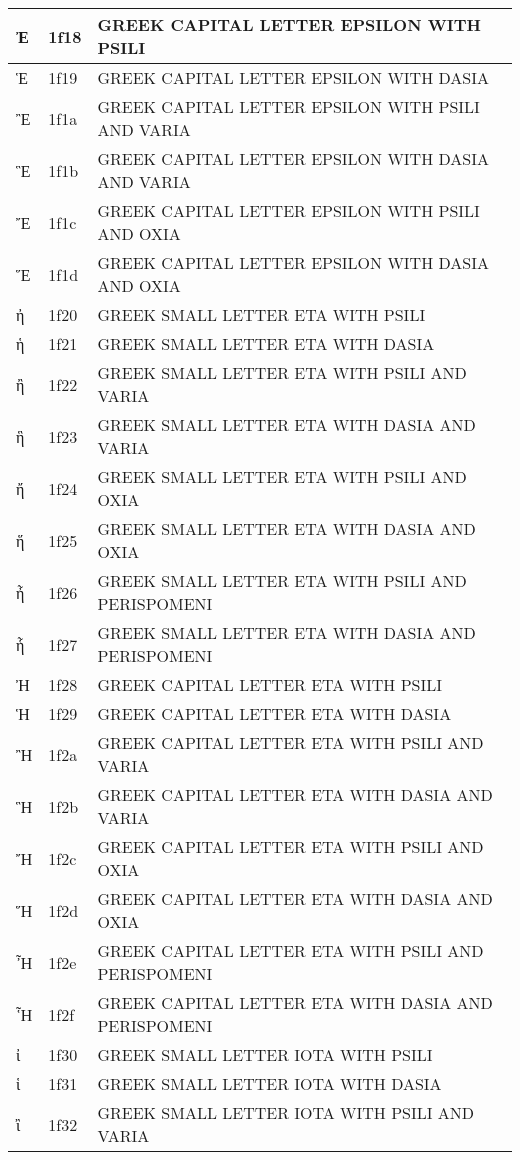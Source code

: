 \documentclass[12pt,letterpaper,openany]{book}
\begin{document}
\begin{center}
\begin{supertabular}{|m{0.25in}|m{0.5in}|m{4in}|}
			Ἐ & 1f18 & GREEK CAPITAL LETTER EPSILON WITH PSILI\\\hline
			Ἑ & 1f19 & GREEK CAPITAL LETTER EPSILON WITH DASIA\\\hline
			Ἒ & 1f1a & GREEK CAPITAL LETTER EPSILON WITH PSILI AND VARIA\\\hline
			Ἓ & 1f1b & GREEK CAPITAL LETTER EPSILON WITH DASIA AND VARIA\\\hline
			Ἔ & 1f1c & GREEK CAPITAL LETTER EPSILON WITH PSILI AND OXIA\\\hline
			Ἕ & 1f1d & GREEK CAPITAL LETTER EPSILON WITH DASIA AND OXIA\\\hline
			ἠ & 1f20 & GREEK SMALL LETTER ETA WITH PSILI\\\hline
			ἡ & 1f21 & GREEK SMALL LETTER ETA WITH DASIA\\\hline
			ἢ & 1f22 & GREEK SMALL LETTER ETA WITH PSILI AND VARIA\\\hline
			ἣ & 1f23 & GREEK SMALL LETTER ETA WITH DASIA AND VARIA\\\hline
			ἤ & 1f24 & GREEK SMALL LETTER ETA WITH PSILI AND OXIA\\\hline
			ἥ & 1f25 & GREEK SMALL LETTER ETA WITH DASIA AND OXIA\\\hline
			ἦ & 1f26 & GREEK SMALL LETTER ETA WITH PSILI AND PERISPOMENI\\\hline
			ἧ & 1f27 & GREEK SMALL LETTER ETA WITH DASIA AND PERISPOMENI\\\hline
			Ἠ & 1f28 & GREEK CAPITAL LETTER ETA WITH PSILI\\\hline
			Ἡ & 1f29 & GREEK CAPITAL LETTER ETA WITH DASIA\\\hline
			Ἢ & 1f2a & GREEK CAPITAL LETTER ETA WITH PSILI AND VARIA\\\hline
			Ἣ & 1f2b & GREEK CAPITAL LETTER ETA WITH DASIA AND VARIA\\\hline
			Ἤ & 1f2c & GREEK CAPITAL LETTER ETA WITH PSILI AND OXIA\\\hline
			Ἥ & 1f2d & GREEK CAPITAL LETTER ETA WITH DASIA AND OXIA\\\hline
			Ἦ & 1f2e & GREEK CAPITAL LETTER ETA WITH PSILI AND PERISPOMENI\\\hline
			Ἧ & 1f2f & GREEK CAPITAL LETTER ETA WITH DASIA AND PERISPOMENI\\\hline
			ἰ & 1f30 & GREEK SMALL LETTER IOTA WITH PSILI\\\hline
			ἱ & 1f31 & GREEK SMALL LETTER IOTA WITH DASIA\\\hline
			ἲ & 1f32 & GREEK SMALL LETTER IOTA WITH PSILI AND VARIA\\\hline

\end{supertabular}
\end{center}
\end{document}
